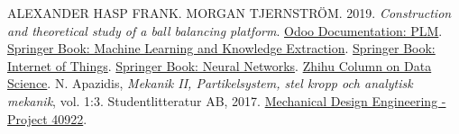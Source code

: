 \newpage
\renewcommand\bibname{參~考~文~獻}
\begin{thebibliography}{99}  %

 ALEXANDER HASP FRANK. MORGAN TJERNSTRÖM. 2019. \textit{Construction and theoretical study of a ball balancing platform}.
 \href{https://www.odoo.com/documentation/16.0/zh_TW/applications/inventory_and_mrp/plm.html}{Odoo Documentation: PLM}.
 \href{https://link.springer.com/book/10.1007/978-3-030-98578-3}{Springer Book: Machine Learning and Knowledge Extraction}.
 \href{https://link.springer.com/book/10.1007/978-3-031-50658-1}{Springer Book: Internet of Things}.
 \href{https://link.springer.com/book/10.1007/978-3-319-75804-6}{Springer Book: Neural Networks}.
 \href{https://zhuanlan.zhihu.com/p/382346258}{Zhihu Column on Data Science}.
 N. Apazidis, \textit{Mekanik II, Partikelsystem, stel kropp och analytisk mekanik}, vol. 1:3. Studentlitteratur AB, 2017.
 \href{https://mde.tw/pj40922/content/index.html}{Mechanical Design Engineering - Project 40922}.

\end{thebibliography}
\newpage
